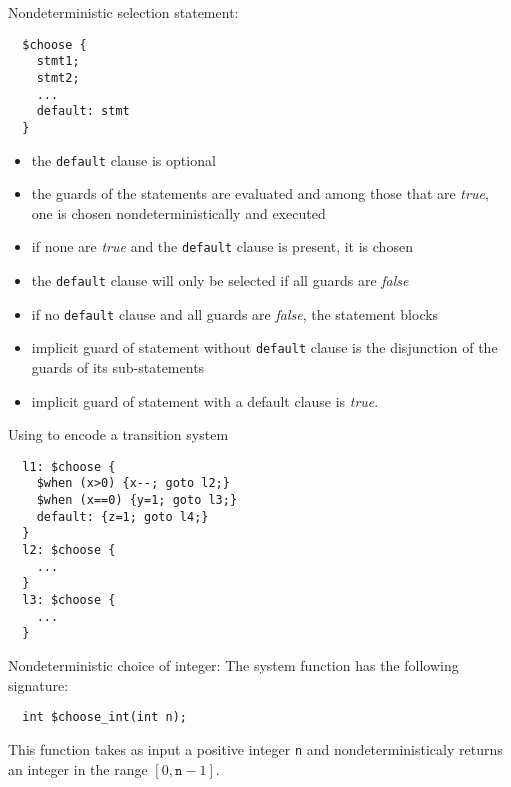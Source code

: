 \documentclass[t]{beamer}
\begin{document}
\begin{frame}[containsverbatim]{Nondeterministic selection statement: \cchoose}
\begin{verbatim}
  $choose {
    stmt1;
    stmt2;
    ...
    default: stmt
  }
\end{verbatim}

  \begin{itemize}
  \item  the \texttt{default} clause is optional
  \item the guards of the statements are evaluated and among those that are
    \emph{true}, one is chosen nondeterministically and executed
  \item if none are \emph{true} and the \texttt{default} clause is
    present, it is chosen
  \item the \texttt{default} clause will only be selected if all
    guards are \emph{false}
  \item if no \texttt{default} clause and
    all guards are \emph{false}, the statement blocks
  \item implicit
    guard of \cchoose{} statement without \texttt{default} clause is
    the disjunction of the guards of its sub-statements
  \item implicit guard of \cchoose{} statement with a default
    clause is \emph{true}.
  \end{itemize}
\end{frame}

\begin{frame}[containsverbatim]{Using \cchoose{} to encode a
    transition system}
\begin{verbatim}
  l1: $choose {
    $when (x>0) {x--; goto l2;}
    $when (x==0) {y=1; goto l3;}
    default: {z=1; goto l4;}
  }
  l2: $choose {
    ...
  }
  l3: $choose {
    ...
  }
\end{verbatim}
\end{frame}


\begin{frame}[containsverbatim]{Nondeterministic choice of integer: \cchooseint}
  The system function \cchooseint{} has the following signature:

\begin{verbatim}
  int $choose_int(int n);
\end{verbatim}

  This function takes as input a positive integer \texttt{n} and
  nondeterministicaly returns an integer in the range
  $[0,\texttt{n}-1]$.
\end{frame}
\end{document}
